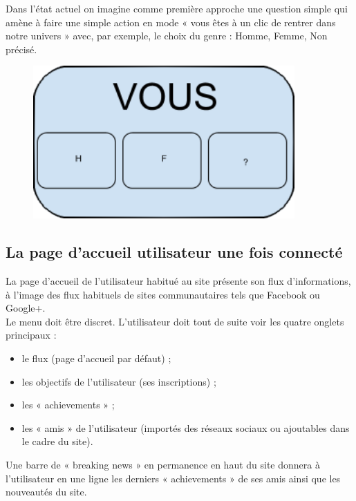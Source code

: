 \documentclass{life-fr}
\begin{document}
Dans l'état actuel on imagine comme première approche une question simple qui amène à faire une simple action en mode « vous êtes à un clic de rentrer dans notre univers » avec, par exemple, le choix du genre : Homme, Femme, Non précisé.

\begin{figure}[H]
  \begin{center}
    \includegraphics[width=10cm]{img/vous.png}
  \end{center}
\end{figure}

\subsection{La page d'accueil utilisateur une fois connecté}

La page d'accueil de l'utilisateur habitué au site présente son flux d'informations, à l'image des flux habituels de sites communautaires tels que Facebook ou Google+. \\

Le menu doit être discret. L'utilisateur doit tout de suite voir les quatre onglets principaux :

\begin{itemize}
  \item le flux (page d'accueil par défaut) ;
  \item les objectifs de l'utilisateur (ses inscriptions) ;
  \item les « achievements » ;
  \item les « amis » de l'utilisateur (importés des réseaux sociaux ou ajoutables dans le cadre du site).
\end{itemize}

Une barre de « breaking news » en permanence en haut du site donnera à l'utilisateur en une ligne les derniers « achievements » de ses amis ainsi que les nouveautés du site.
\end{document}
